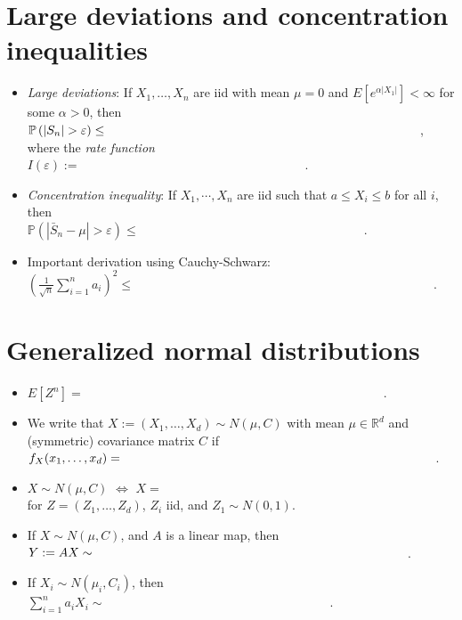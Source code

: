 \documentclass[12pt,reqno]{article}
\renewcommand{\emph}[1]{\textit{#1}}
\theoremstyle{plain}
\theoremstyle{definition}
\newcommand{\PP}[1]{\ensuremath{\mathbb{P}\left(#1\right)}}
\begin{document}
\section{Large deviations and concentration inequalities} 

\begin{itemize} 

\item \emph{Large deviations}: If $X_1,\ldots,X_n$ are iid with mean $\mu = 0$ and 
      $E[e^{\alpha|X_1|}] < \infty$ for some $\alpha > 0$, then \\ 
      $\PP{|S_n| > \varepsilon} \leq \hspace{3.5in}$, \\ 
      where the \emph{rate function} \\ 
      $I(\varepsilon) := \hspace{3in}$. 
\item \emph{Concentration inequality}: If $X_1,\cdots,X_n$ are iid such that $a \leq X_i \leq b$ 
      for all $i$, then \\ 
      $\PP{|\bar{S}_n-\mu| > \varepsilon} \leq \hspace{3in}$. 
\item Important derivation using Cauchy-Schwarz: \\ 
      $\left(\frac{1}{\sqrt{n}} \sum_{i=1}^n a_i\right)^2 \leq \hspace{4in}$. 

\end{itemize} 

\section{Generalized normal distributions} 

\begin{itemize} 

\item $E[Z^n] = \hspace{4in}$. 
\item We write that $X := (X_1,\ldots,X_d) \sim N(\mu, C)$ with mean $\mu \in \mathbb{R}^d$ and 
      (symmetric) covariance matrix $C$ if \\ 
      $f_X(x_1,\ldots,x_d) = \hspace{3.5in}$. 
\item $X \sim N(\mu, C)$ $\iff$ $X = \hspace{2in}$ \\ 
      for $Z = (Z_1,\ldots,Z_d)$, $Z_i$ iid, and $Z_1 \sim N(0, 1)$. 
\item If $X \sim N(\mu, C)$, and $A$ is a linear map, then \\ 
      $Y := AX \sim \hspace{3.5in}$. 
\item If $X_i \sim N(\mu_i, C_i)$, then \\ $\sum_{i=1}^n a_iX_i \sim \hspace{3in}$. 

\end{itemize} 
\end{document}
